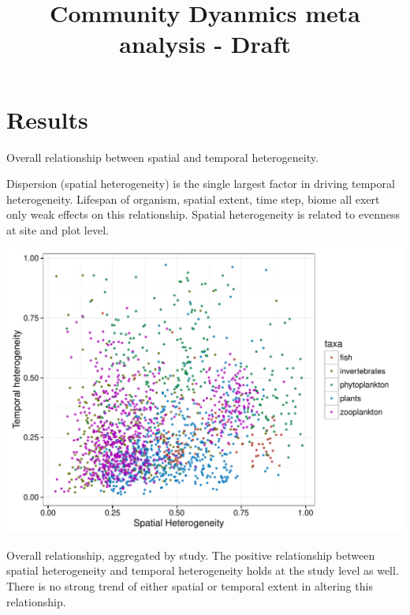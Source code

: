 \documentclass[11pt]{article}
\title{Community Dyanmics meta analysis - Draft}
\begin{document}
\maketitle



\section{Results}

Overall relationship between spatial and temporal heterogeneity.

Dispersion (spatial heterogeneity) is the single largest factor in driving temporal heterogeneity. Lifespan of organism, spatial extent, time step, biome all exert only weak effects on this relationship. Spatial heterogeneity is related to evenness at site and plot level. 

\includegraphics[scale=0.7]{overall}

\newpage
Overall relationship, aggregated by study. The positive relationship between spatial heterogeneity and temporal heterogeneity holds at the study level as well. There is no strong trend of either spatial or temporal extent in altering this relationship.
\end{document}
